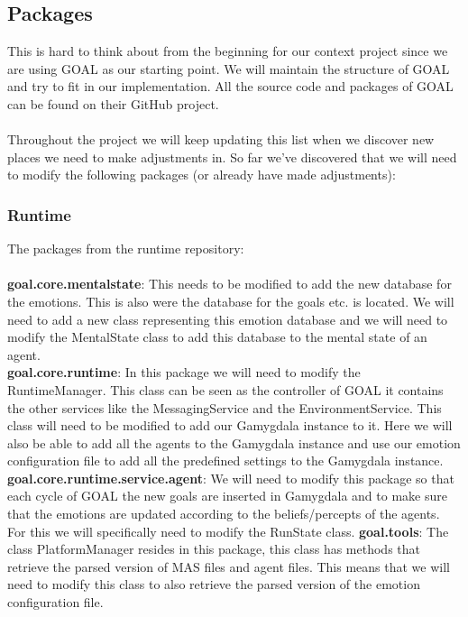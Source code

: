 \documentclass[]{article}
\begin{document}
\subsection{Packages}
This is hard to think about from the beginning for our context project since we are using GOAL as our starting point. We will maintain the structure of GOAL and try to fit in our implementation. All the source code and \gls{packages} of GOAL can be found on their GitHub project.
\\
\\
Throughout the project we will keep updating this list when we discover new places we need to make adjustments in. So far we've discovered that we will need to modify the following packages (or already have made adjustments):

\subsubsection{Runtime}
The packages from the runtime repository: \\ \\
\textbf{goal.core.mentalstate}: This needs to be modified to add the new database for the emotions. This is also were the database for the goals etc. is located. We will need to add a new class representing this emotion database and we will need to modify the MentalState class to add this database to the mental state of an agent. \\
\textbf{goal.core.runtime}: In this package we will need to modify the RuntimeManager. This class can be seen as the controller of GOAL it contains the other services like the MessagingService and the EnvironmentService. This class will need to be modified to add our Gamygdala instance to it. Here we will also be able to add all the agents to the Gamygdala instance and use our emotion configuration file to add all the predefined settings to the Gamygdala instance. \\
\textbf{goal.core.runtime.service.agent}: We will need to modify this package so that each cycle of \gls{GOAL} the new goals are inserted in Gamygdala and to make sure that the emotions are updated according to the beliefs/percepts of the agents. For this we will specifically need to modify the RunState class.
\textbf{goal.tools}: The class PlatformManager resides in this package, this class has methods that retrieve the parsed version of MAS files and agent files. This means that we will need to modify this class to also retrieve the parsed version of the emotion configuration file.
\end{document}
